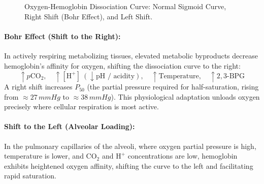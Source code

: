 \documentclass[10pt,twoside,openright]{book}
\begin{document}
\begin{figure}[htbp]
\centering
{}

\caption{Oxygen-Hemoglobin Dissociation Curve: Normal Sigmoid Curve, Right Shift (Bohr Effect), and Left Shift.}
\label{fig:o2_hb_dissociation}
\end{figure}

\paragraph{Bohr Effect (Shift to the Right):}
In actively respiring metabolizing tissues, elevated metabolic byproducts decrease hemoglobin's affinity for oxygen, shifting the dissociation curve to the right:
\begin{equation}
  \uparrow p\mathrm{CO_2}, \quad \uparrow [\mathrm{H}^+] \ (\downarrow \mathrm{pH} \text{ / acidity}), \quad \uparrow \text{Temperature}, \quad \uparrow 2,3\text{-BPG}
\end{equation}
A right shift increases $P_{50}$ (the partial pressure required for half-saturation, rising from $\approx 27\,\si{mmHg}$ to $\approx 38\,\si{mmHg}$). This physiological adaptation unloads oxygen precisely where cellular respiration is most active.

\paragraph{Shift to the Left (Alveolar Loading):}
In the pulmonary capillaries of the alveoli, where oxygen partial pressure is high, temperature is lower, and $\mathrm{CO_2}$ and $\mathrm{H}^+$ concentrations are low, hemoglobin exhibits heightened oxygen affinity, shifting the curve to the left and facilitating rapid saturation.
\end{document}
